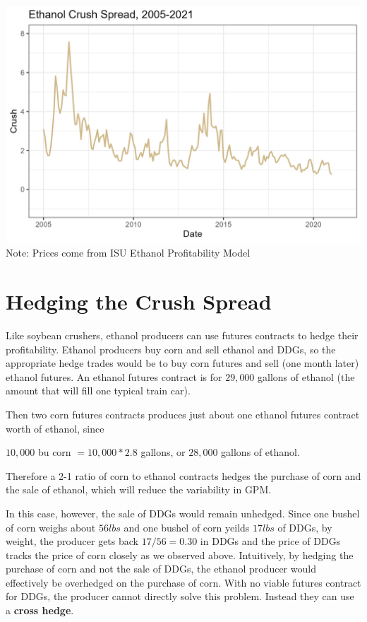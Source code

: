 \documentclass[
  letterpaper,
  DIV=11,
  numbers=noendperiod]{scrreprt}
\begin{document}
\includegraphics{assets/ECrushSpread.png} Note: Prices come from ISU
Ethanol Profitability Model

\section{Hedging the Crush Spread}\label{hedging-the-crush-spread}

Like soybean crushers, ethanol producers can use futures contracts to
hedge their profitability. Ethanol producers buy corn and sell ethanol
and DDGs, so the appropriate hedge trades would be to buy corn futures
and sell (one month later) ethanol futures. An ethanol futures contract
is for \(29,000\) gallons of ethanol (the amount that will fill one
typical train car).

Then two corn futures contracts produces just about one ethanol futures
contract worth of ethanol, since

\(10,000\) bu corn \(= 10,000*2.8\) gallons, or \(28,000\) gallons of
ethanol.

Therefore a 2-1 ratio of corn to ethanol contracts hedges the purchase
of corn and the sale of ethanol, which will reduce the variability in
GPM.

In this case, however, the sale of DDGs would remain unhedged. Since one
bushel of corn weighs about \(56lbs\) and one bushel of corn yeilds
\(17lbs\) of DDGs, by weight, the producer gets back \(17/56 = 0.30\) in
DDGs and the price of DDGs tracks the price of corn closely as we
observed above. Intuitively, by hedging the purchase of corn and not the
sale of DDGs, the ethanol producer would effectively be overhedged on
the purchase of corn. With no viable futures contract for DDGs, the
producer cannot directly solve this problem. Instead they can use a
\textbf{cross hedge}.
\end{document}

